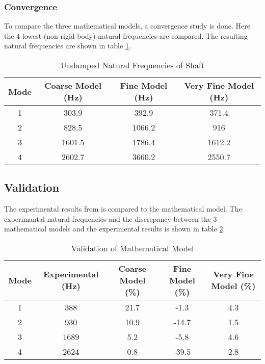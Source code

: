\subsubsection{Convergence}
To compare the three mathematical models, a convergence study is done. Here the 4 lowest (non rigid body) natural frequencies are compared.
The resulting natural frequencies are shown in table \ref{tab:natural_freq}.
\begin{table}[ht]
    \centering
    \caption{Undamped Natural Frequencies of Shaft}
    \label{tab:natural_freq}
    \begin{tabular}{@{}cccc@{}}
        \toprule
        Mode    &   Coarse Model (\si{\hertz})    &   Fine Model (\si{\hertz})  &   Very Fine Model (\si{\hertz}) \\ \midrule
        1       &   303.9   &   392.9   &   371.4   \\
        2       &   828.5   &   1066.2  &   916     \\
        3       &   1601.5  &   1786.4  &   1612.2  \\
        4       &   2602.7  &   3660.2  &   2550.7  \\ \bottomrule
    \end{tabular}
\end{table}

\subsection{Validation}
The experimental results from \cite[6]{Problem} is compared to the mathematical model. The experimantal natural frequencies and the discrepancy between the 3 mathematical models and the experimental results is shown in table \ref{tab:validation}.

\begin{table}[ht]
    \centering
    \caption{Validation of Mathematical Model}
    \label{tab:validation}
    \begin{adjustwidth}{-0.5cm}{-0.5cm}        
    \begin{tabular}{@{}ccccc@{}}
        \toprule
        Mode    &   Experimental (\si{\hertz})    &   Coarse Model (\si{\percent})    &   Fine Model (\si{\percent})  &   Very Fine Model (\si{\percent}) \\ \midrule
        1       &   388     &   21.7   &   -1.3   &   4.3   \\
        2       &   930     &   10.9   &   -14.7  &   1.5     \\
        3       &   1689    &   5.2  &   -5.8  &   4.6  \\
        4       &   2624    &   0.8  &   -39.5  &   2.8  \\ \bottomrule
    \end{tabular}
    \end{adjustwidth}
\end{table}



